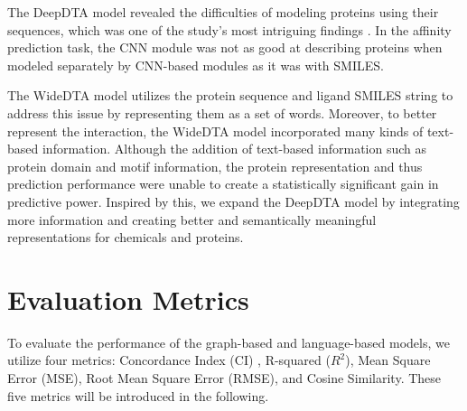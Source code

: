 
The DeepDTA model revealed the difficulties of modeling proteins using their sequences, which was one of the study's most intriguing findings \cite{ozturk2018deepdta}. In the affinity prediction task, the CNN module was not as good at describing proteins when modeled separately by CNN-based modules as it was with SMILES. 

The WideDTA model utilizes the protein sequence and ligand SMILES string to address this issue by representing them as a set of words. Moreover, to better represent the interaction, the WideDTA model incorporated many kinds of text-based information. Although the addition of text-based information such as protein domain and motif information, the protein representation and thus prediction performance were unable to create a statistically significant gain in predictive power. Inspired by this, we expand the DeepDTA model by integrating more information and creating better and semantically meaningful representations for chemicals and proteins.

\section{Evaluation Metrics}
\label{section:evaluation}
To evaluate the performance of the graph-based and language-based models, we utilize four metrics: Concordance Index (CI) \cite{gonen2005concordance}, R-squared ($R^2$), Mean Square Error (MSE), Root Mean Square Error (RMSE), and Cosine Similarity. These five metrics will be introduced in the following.

